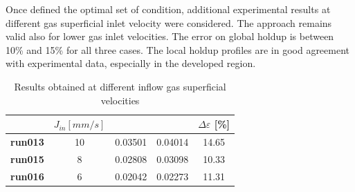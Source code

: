 \documentclass[11pt,a4paper]{article}
\newcommand{\thead}[2][.95in]{%
  \vbox{\hsize#1\baselineskip11pt\centering\vspace*{3pt}#2\par}}
\begin{document}
Once defined the optimal set of condition, additional experimental results at different gas superficial inlet velocity were considered. The approach remains valid also for lower gas inlet velocities. The error on global holdup is between 10\% and 15\% for all three cases. The local holdup profiles are in good agreement with experimental data, especially in the developed region.


\begin{table}[H]
    \centering 
    \begin{tabular}{|p{8em} c c c c|}
    \hline
    \rowcolor{bluePoli!40}
    & \textbf{$J_{in} [mm/s]$}  & \thead{Experimental holdup [-]} & \thead{Numerical holdup [-]} & $\Delta \varepsilon$ [\%]\T\B \\
    \hline \hline
    \textbf{run013} & 10 & 0.03501 & 0.04014 & 14.65\T\B \\
    \textbf{run015} & 8  & 0.02808 & 0.03098 & 10.33\T\B \\
    \textbf{run016} & 6  & 0.02042 & 0.02273 & 11.31\T\B \\
    \hline
    \end{tabular}    \\[10pt]
    \caption{Results obtained at different inflow gas superficial velocities}
    \label{table:inflow_velocities}
\end{table}
\end{document}
